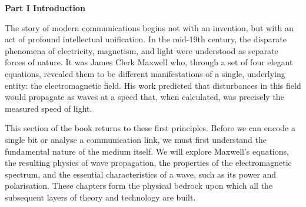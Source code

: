 \newpage
\thispagestyle{empty}

\vspace*{3cm}

\begin{center}
{\Large\lorettadisplay\bfseries Part I Introduction}
\end{center}

\vspace{2cm}

The story of modern communications begins not with an invention, but with an act of profound intellectual unification. In the mid-19th century, the disparate phenomena of electricity, magnetism, and light were understood as separate forces of nature. It was James Clerk Maxwell who, through a set of four elegant equations, revealed them to be different manifestations of a single, underlying entity: the electromagnetic field. His work predicted that disturbances in this field would propagate as waves at a speed that, when calculated, was precisely the measured speed of light.

\vspace{1em}

This section of the book returns to these first principles. Before we can encode a single bit or analyse a communication link, we must first understand the fundamental nature of the medium itself. We will explore Maxwell's equations, the resulting physics of wave propagation, the properties of the electromagnetic spectrum, and the essential characteristics of a wave, such as its power and polarisation. These chapters form the physical bedrock upon which all the subsequent layers of theory and technology are built.

\vspace*{\fill}
\newpage
